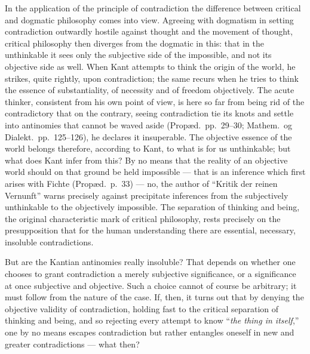\documentclass[12pt,a4paper]{book}
\begin{document}
In the application of the principle of contradiction the difference between
critical and dogmatic philosophy comes into view. Agreeing with dogmatism in
setting contradiction outwardly hostile against thought and the movement of
thought, critical philosophy then diverges from the dogmatic in this: that in
the unthinkable it sees only the subjective side of the impossible, and not its
objective side as well. When Kant attempts to think the origin of the world, he
strikes, quite rightly, upon contradiction; the same recurs when he tries to
think the essence of substantiality, of necessity and of freedom objectively.
The acute thinker, consistent from his own point of view, is here so far from
being rid of the contradictory that on the contrary, seeing contradiction tie
its knots and settle into antinomies that cannot be waved aside (Propæd.\
pp.~29--30; Mathem.\ og Dialekt.\ pp.~125--126), he declares it insuperable.
The objective essence of the world belongs therefore, according to Kant, to
what is for us unthinkable; but what does Kant infer from this? By no means
that the reality of an objective world should on that ground be held impossible
--- that is an inference which first arises with Fichte (Propæd.\ p.~33) ---
no, the author of ``Kritik der reinen Vernunft'' warns precisely against
precipitate inferences from the subjectively unthinkable to the objectively
impossible. The separation of thinking and being, the original characteristic
mark of critical philosophy, rests precisely on the presupposition that for the
human understanding there are essential, necessary, insoluble contradictions.

But are the Kantian antinomies really insoluble? That depends on whether one
chooses to grant contradiction a merely subjective significance, or a
significance at once subjective and objective. Such a choice cannot of course
be arbitrary; it must follow from the nature of the case. If, then, it turns
out that by denying the objective validity of contradiction, holding fast to
the critical separation of thinking and being, and so rejecting every attempt
to know ``\emph{the thing in itself},'' one by no means escapes contradiction
but rather entangles oneself in new and greater contradictions --- what then?


\setcounter{footnote}{0}
\end{document}
